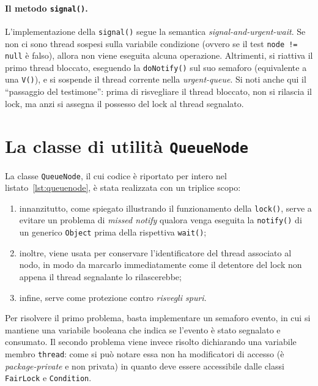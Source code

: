 \documentclass[a4paper,twoside]{article}
\newcommand\code{\lstinline[basicstyle=\normalsize\ttfamily]}
\begin{document}
\paragraph{Il metodo \texttt{signal()}.}
L'implementazione della \code|signal()| segue la semantica \emph{signal-and-urgent-wait}. Se non ci sono thread sospesi sulla variabile condizione (ovvero se il test \code|node != null| è falso), allora non viene eseguita alcuna operazione. Altrimenti, si riattiva il primo thread bloccato, eseguendo la \code|doNotify()| sul suo semaforo (equivalente a una \code|V()|), e si sospende il thread corrente nella \emph{urgent-queue}. Si noti anche qui il “passaggio del testimone”: prima di risvegliare il thread bloccato, non si rilascia il lock, ma anzi si assegna il possesso del lock al thread segnalato.


\section{La classe di utilità \texttt{QueueNode}}

La classe \code|QueueNode|, il cui codice è riportato per intero nel listato~\ref{lst:queuenode}, è stata realizzata con un triplice scopo:
\begin{enumerate}
\item innanzitutto, come spiegato illustrando il funzionamento della \code|lock()|, serve a evitare un problema di \emph{missed notify} qualora venga eseguita la \code|notify()| di un generico \code|Object| prima della rispettiva \code|wait()|;
\item inoltre, viene usata per conservare l'identificatore del thread associato al nodo, in modo da marcarlo immediatamente come il detentore del lock non appena il thread segnalante lo rilascerebbe;
\item infine, serve come protezione contro \emph{risvegli spuri}.
\end{enumerate}



Per risolvere il primo problema, basta implementare un semaforo evento, in cui si mantiene una variabile booleana che indica se l'evento è stato segnalato e consumato. Il secondo problema viene invece risolto dichiarando una variabile membro \code|thread|: come si può notare essa non ha modificatori di accesso (è \emph{package-private} e non privata) in quanto deve essere accessibile dalle classi \code|FairLock| e \code|Condition|.
\end{document}
